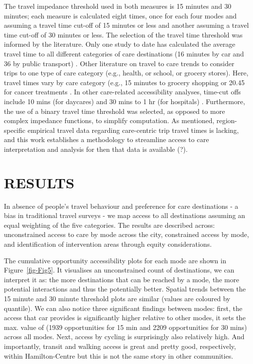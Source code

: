 \documentclass[
  super,
  preprint,
  3p]{elsarticle}
\begin{document}
The travel impedance threshold used in both measures is 15 minutes and
30 minutes; each measure is calculated eight times, once for each four
modes and assuming a travel time cut-off of 15 minutes or less and
another assuming a travel time cut-off of 30 minutes or less. The
selection of the travel time threshold was informed by the literature.
Only one study to date has calculated the average travel time to all
different categories of care destinations (16 minutes by car and 36 by
public transport) \citep{grantsmithManagingChallengesCombining2016}.
Other literature on travel to care trends to consider trips to one type
of care category (e.g., health, or school, or grocery stores). Here,
travel times vary by care category (e.g., 15 minutes to grocery shopping
\citep{hamrickTimeCostAccess2012} or 20.45 for cancer treatments
\citep{segelRuralurbanDifferencesAssociation2020}. In other care-related
accessibility analyses, time-cut offs include 10 mins (for daycares)
\citep{fransenCommuterbasedTwostepFloating2015} and 30 mins to 1 hr (for
hospitals) \citep{schuurmanDefiningRationalHospital2006}. Furthermore,
the use of a binary travel time threshold was selected, as opposed to
more complex impedance functions, to simplify computation. As mentioned,
region-specific empirical travel data regarding care-centric trip travel
times is lacking, and this work establishes a methodology to streamline
access to care interpretation and analysis for then that data is
available (?).

\hypertarget{results}{%
\section{RESULTS}\label{results}}

In absence of people's travel behaviour and preference for care
destinations - a bias in traditional travel surveys - we map access to
all destinations assuming an equal weighting of the five categories. The
results are described across: unconstrained access to care by mode
across the city, constrained access by mode, and identification of
intervention areas through equity considerations.

The cumulative opportunity accessibility plots for each mode are shown
in Figure~\ref{fig-Fig5}. It visualises an unconstrained count of
destinations, we can interpret it as: the more destinations that can be
reached by a mode, the more potential interactions and thus the
potentially better. Spatial trends between the 15 minute and 30 minute
threshold plots are similar (values are coloured by quantile). We can
also notice three significant findings between modes: first, the access
that car provides is significantly higher relative to other modes, it
sets the max. value of (1939 opportunities for 15 min and 2209
opportunities for 30 mins) across all modes. Next, access by cycling is
surprisingly also relatively high. And importantly, transit and walking
access is great and pretty good, respectively, within Hamilton-Centre
but this is not the same story in other communities.
\end{document}
